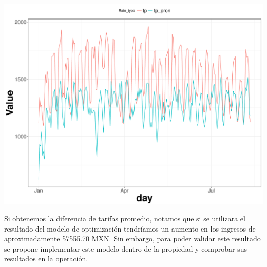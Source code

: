 \includegraphics[width=\maxwidth]{figures/Pricing-1} 

Si obtenemos la diferencia de tarifas promedio, notamos que si se utilizara el resultado del modelo de optimización tendríamos un aumento en los ingresos de aproximadamente 57555.70 MXN. Sin embargo, para poder validar este resultado se propone implementar este modelo dentro de la propiedad y comprobar sus resultados en la operación.





